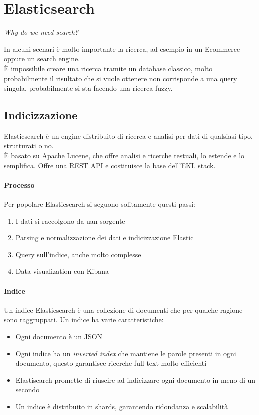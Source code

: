 \section{Elasticsearch}
\begin{center}
    \emph{Why do we need search?}
\end{center}
In alcuni scenari è molto importante la ricerca, ad esempio in un Ecommerce oppure
un search engine.\\
È impossibile creare una ricerca tramite un database classico, molto probabilmente
il risultato che si vuole ottenere non corrisponde a una query singola, probabilmente
si sta facendo una ricerca fuzzy.

\subsection{Indicizzazione}
Elasticsearch è un engine distribuito di ricerca e analisi per dati di qualsiasi tipo, 
strutturati o no.\\
È basato su Apache Lucene, che offre analisi e ricerche testuali, lo estende e lo semplifica.
Offre una REST API e costituisce la base dell'EKL stack.

\paragraph{Processo}
Per popolare Elasticsearch si seguono solitamente questi passi:
\begin{enumerate}
    \item I dati si raccolgono da uan sorgente
    \item Parsing e normalizzazione dei dati e indicizzazione Elastic
    \item Query sull'indice, anche molto complesse
    \item Data visualization con Kibana
\end{enumerate}

\paragraph{Indice}
Un indice Elasticsearch è una collezione di documenti che per qualche ragione sono raggruppati.
Un indice ha varie caratteristiche:
\begin{itemize}
    \item Ogni documento è un JSON
    \item Ogni indice ha un \emph{inverted index} che mantiene le parole presenti in ogni documento, 
    questo garantisce ricerche full-text molto efficienti
    \item Elastisearch promette di riuscire ad indicizzare ogni documento in meno di un secondo
    \item Un indice è distribuito in shards, garantendo ridondanza e scalabilità
\end{itemize}

